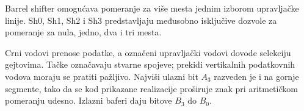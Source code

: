 Barrel shifter omogućava pomeranje za više mesta jednim izborom upravljačke linije. Sh0, Sh1, Sh2 i Sh3 predstavljaju međusobno isključive dozvole za pomeranje za nula, jedno, dva i tri mesta.

Crni vodovi prenose podatke, a označeni upravljački vodovi dovode selekciju gejtovima. Tačke označavaju stvarne spojeve; prekidi vertikalnih podatkovnih vodova moraju se pratiti pažljivo. Najviši ulazni bit $A_3$ razveden je i na gornje segmente, tako da se kod prikazane realizacije proširuje znak pri aritmetičkom pomeranju udesno. Izlazni baferi daju bitove $B_3$ do $B_0$.
